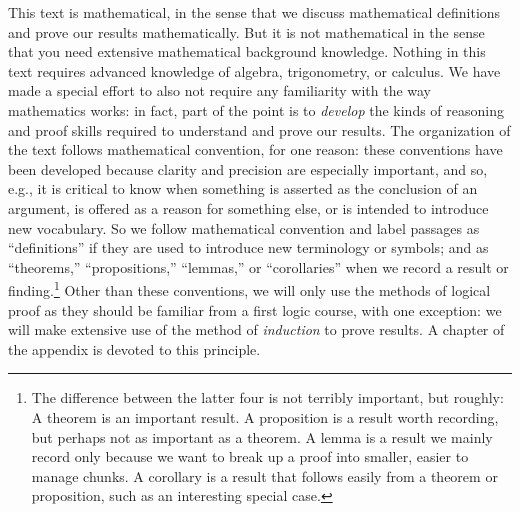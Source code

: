 This text is mathematical, in the sense that we discuss mathematical
definitions and prove our results mathematically.  But it is not
mathematical in the sense that you need extensive mathematical
background knowledge.  Nothing in this text requires advanced
knowledge of algebra, trigonometry, or calculus.  We have made a
special effort to also not require any familiarity with the way
mathematics works: in fact, part of the point is to \emph{develop} the
kinds of reasoning and proof skills required to understand and prove
our results.  The organization of the text follows mathematical
convention, for one reason: these conventions have been developed
because clarity and precision are especially important, and so, e.g.,
it is critical to know when something is asserted as the conclusion of
an argument, is offered as a reason for something else, or is intended
to introduce new vocabulary. So we follow mathematical convention and
label passages as ``definitions'' if they are used to introduce new
terminology or symbols; and as ``theorems,'' ``propositions,''
``lemmas,'' or ``corollaries'' when we record a result or
finding.\footnote{The difference between the latter four is not
  terribly important, but roughly: A theorem is an important result. A
  proposition is a result worth recording, but perhaps not as
  important as a theorem. A lemma is a result we mainly record only
  because we want to break up a proof into smaller, easier to manage
  chunks.  A corollary is a result that follows easily from a theorem
  or proposition, such as an interesting special case.}  Other than
these conventions, we will only use the methods of logical proof as
they should be familiar from a first logic course, with one exception:
we will make extensive use of the method of \emph{induction} to prove
results.  A chapter of the appendix is devoted to this principle.

